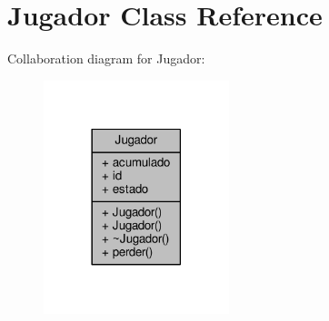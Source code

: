\hypertarget{class_jugador}{\section{Jugador Class Reference}
\label{class_jugador}
}


Collaboration diagram for Jugador\+:
\nopagebreak
\begin{figure}[H]
\begin{center}
\leavevmode
\includegraphics[width=153pt]{class_jugador__coll__graph}
\end{center}
\end{figure}
